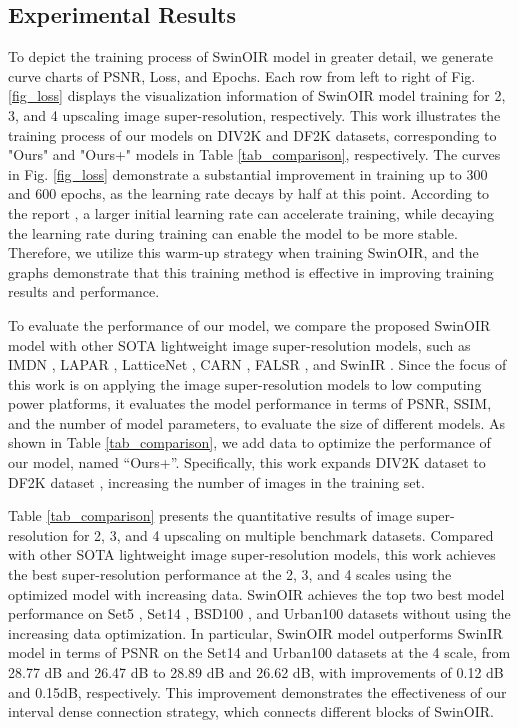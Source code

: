\documentclass[default,iicol]{sn-jnl}
\theoremstyle{thmstyleone}\newtheorem{theorem}{Theorem}\newtheorem{proposition}[theorem]{Proposition}
\theoremstyle{thmstyletwo}\newtheorem{example}{Example}\newtheorem{remark}{Remark}\theoremstyle{thmstylethree}\newtheorem{definition}{Definition}
\begin{document}
\subsection{Experimental Results}
To depict the training process of SwinOIR model in greater detail, we generate curve charts of PSNR, Loss, and Epochs. Each row from left to right of Fig. \ref{fig_loss} displays the visualization information of SwinOIR model training for 2, 3, and 4 upscaling image super-resolution, respectively. This work illustrates the training process of our models on DIV2K \cite{Ignatov2018} and DF2K \cite{timofte2017ntire} datasets, corresponding to "Ours" and "Ours+" models in Table \ref{tab_comparison}, respectively. The curves in Fig. \ref{fig_loss} demonstrate a substantial improvement in training up to 300 and 600 epochs, as the learning rate decays by half at this point. According to the report \cite{liang2021swinir}, a larger initial learning rate can accelerate training, while decaying the learning rate during training can enable the model to be more stable. Therefore, we utilize this warm-up strategy when training SwinOIR, and the graphs demonstrate that this training method is effective in improving training results and performance.

To evaluate the performance of our model, we compare the proposed SwinOIR model with other SOTA lightweight image super-resolution models, such as IMDN \cite{hui2019lightweight}, LAPAR \cite{li2020lapar}, LatticeNet \cite{luo2020latticenet}, CARN \cite{ahn2018fast}, FALSR \cite{chu2021fast}, and SwinIR \cite{liang2021swinir}. Since the focus of this work is on applying the image super-resolution models to low computing power platforms, it evaluates the model performance in terms of PSNR, SSIM, and the number of model parameters, to evaluate the size of different models. As shown in Table \ref{tab_comparison}, we add data to optimize the performance of our model, named ``Ours+''. Specifically, this work expands DIV2K dataset \cite{Ignatov2018} to DF2K dataset \cite{timofte2017ntire}, increasing the number of images in the training set.

Table \ref{tab_comparison} presents the quantitative results of image super-resolution for 2, 3, and 4 upscaling on multiple benchmark datasets. Compared with other SOTA lightweight image super-resolution models, this work achieves the best super-resolution performance at the 2, 3, and 4 scales using the optimized model with increasing data. SwinOIR achieves the top two best model performance on Set5 \cite{bevilacqua2012low}, Set14 \cite{zeyde2012single}, BSD100 \cite{martin2001database}, and Urban100 \cite{huang2015single} datasets without using the increasing data optimization. In particular, SwinOIR model outperforms SwinIR model in terms of PSNR on the Set14 and Urban100 datasets at the 4 scale, from 28.77 dB and 26.47 dB to 28.89 dB and 26.62 dB, with improvements of 0.12 dB and 0.15dB, respectively. This improvement demonstrates the effectiveness of our interval dense connection strategy, which connects different blocks of SwinOIR.
\end{document}
